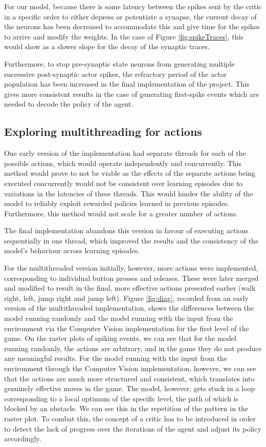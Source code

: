 \documentclass[10pt]{article}
\begin{document}
    For our model, because there is some latency between the spikes sent by the critic in a specific order to either depress or potentiate a synapse, the current decay of the neurons has been decreased to accommodate this and give time for the spikes to arrive and modify the weights. In the case of Figure \ref{fig:spikeTraces}, this would show as a slower slope for the decay of the synaptic traces.
    
    Furthermore, to stop pre-synaptic state neurons from generating multiple successive post-synaptic actor spikes, the refractory period of the actor population has been increased in the final implementation of the project. This gives more consistent results in the case of generating first-spike events which are needed to decode the policy of the agent.

    \subsection{Exploring multithreading for actions}

    One early version of the implementation had separate threads for each of the possible actions, which would operate independently and concurrently. This method would prove to not be viable as the effects of the separate actions being executed concurrently would not be consistent over learning episodes due to variations in the latencies of these threads. This would hinder the ability of the model to reliably exploit rewarded policies learned in previous episodes. Furthermore, this method would not scale for a greater number of actions. 
    
    The final implementation abandons this version in favour of executing actions sequentially in one thread, which improved the results and the consistency of the model's behaviour across learning episodes.
    
    For the multithreaded version initially, however, more actions were implemented, corresponding to individual button presses and releases. These were later merged and modified to result in the final, more effective actions presented earlier (walk right, left, jump right and jump left). Figure \ref{fig:diag}, recorded from an early version of the multithreaded implementation, shows the differences between the model running randomly and the model running with the input from the environment via the Computer Vision implementation for the first level of the game. On the raster plots of spiking events, we can see that for the model running randomly, the actions are arbitrary, and in the game they do not produce any meaningful results. For the model running with the input from the environment through the Computer Vision implementation, however, we can see that the actions are much more structured and consistent, which translates into genuinely effective moves in the game. The model, however, gets stuck in a loop corresponding to a local optimum of the specific level, the path of which is blocked by an obstacle. We can see this in the repetition of the pattern in the raster plot. To combat this, the concept of a critic has to be introduced in order to detect the lack of progress over the iterations of the agent and adjust its policy accordingly.
\end{document}
